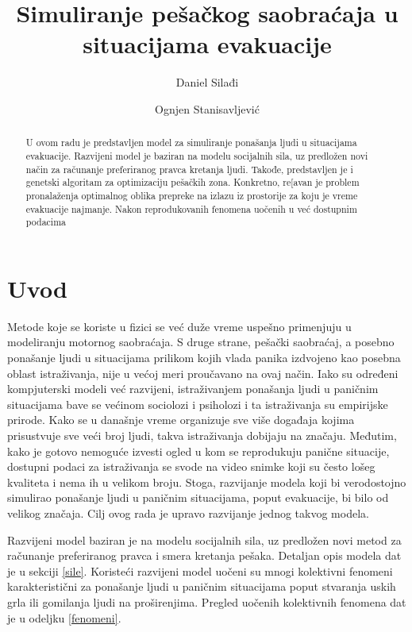 \documentclass[12pt]{article}
\begin{document}
\title{\textbf{Simuliranje pešačkog saobraćaja u situacijama evakuacije}}

\author{
Daniel Silađi\\
\and
Ognjen Stanisavljević
}

\date{} %
\maketitle %


\begin{abstract}
U ovom radu je predstavljen model za simuliranje ponašanja ljudi u situacijama evakuacije. Razvijeni model je baziran na modelu socijalnih sila, uz predložen novi način za računanje preferiranog pravca kretanja ljudi. Takođe, predstavljen je i genetski algoritam za optimizaciju pešačkih zona. Konkretno, re[avan je problem pronalaženja optimalnog oblika prepreke na izlazu iz prostorije za koju je vreme evakuacije najmanje. Nakon reprodukovanih fenomena uočenih u već dostupnim podacima 
\end{abstract}


\section{Uvod}

Metode koje se koriste u fizici se već duže vreme uspešno primenjuju u  modeliranju motornog saobraćaja. S druge strane, pešački saobraćaj, a posebno ponašanje ljudi u situacijama prilikom kojih vlada panika izdvojeno kao posebna oblast istraživanja, nije u većoj meri proučavano na ovaj način. Iako su određeni kompjuterski modeli već razvijeni, istraživanjem ponašanja ljudi u paničnim situacijama bave  se većinom sociolozi i psiholozi i ta istraživanja su empirijske prirode. Kako se u današnje vreme organizuje sve više događaja kojima prisustvuje sve veći broj ljudi, takva istraživanja dobijaju na značaju. Međutim, kako je gotovo nemoguće izvesti ogled u kom se reprodukuju panične situacije, dostupni podaci za istraživanja se svode na video snimke koji su često lošeg kvaliteta i nema ih u velikom broju. Stoga, razvijanje modela koji bi verodostojno simulirao ponašanje ljudi u paničnim situacijama, poput evakuacije, bi bilo od velikog značaja. Cilj ovog rada je upravo razvijanje jednog takvog modela.

Razvijeni model baziran je na modelu socijalnih sila, uz predložen novi metod za računanje preferiranog pravca i smera kretanja pešaka. Detaljan opis modela dat je u sekciji \ref{sile}. Koristeći razvijeni model uočeni su mnogi kolektivni fenomeni karakteristični za ponašanje ljudi u paničnim situacijama poput stvaranja uskih grla ili gomilanja ljudi na proširenjima. Pregled uočenih kolektivnih fenomena dat je u odeljku \ref{fenomeni}. 
\end{document}
